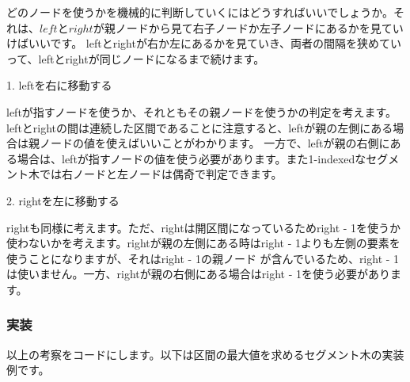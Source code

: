 \documentclass{jlreq}
\begin{document}
\vspace{1cm}

どのノードを使うかを機械的に判断していくにはどうすればいいでしょうか。それは、$left$と$right$が親ノードから見て右子ノードか左子ノードにあるかを見ていけばいいです。
leftとrightが右か左にあるかを見ていき、両者の間隔を狭めていって、leftとrightが同じノードになるまで続けます。

1. leftを右に移動する

leftが指すノードを使うか、それともその親ノードを使うかの判定を考えます。leftとrightの間は連続した区間であることに注意すると、leftが親の左側にある場合は親ノードの値を使えばいいことがわかります。
一方で、leftが親の右側にある場合は、leftが指すノードの値を使う必要があります。また1-indexedなセグメント木では右ノードと左ノードは偶奇で判定できます。

2. rightを左に移動する

rightも同様に考えます。ただ、rightは開区間になっているためright - 1を使うか使わないかを考えます。rightが親の左側にある時はright - 1よりも左側の要素を使うことになりますが、それはright - 1の親ノード
が含んでいるため、right - 1は使いません。一方、rightが親の右側にある場合はright - 1を使う必要があります。

\subsubsection{実装}

以上の考察をコードにします。以下は区間の最大値を求めるセグメント木の実装例です。
\end{document}
